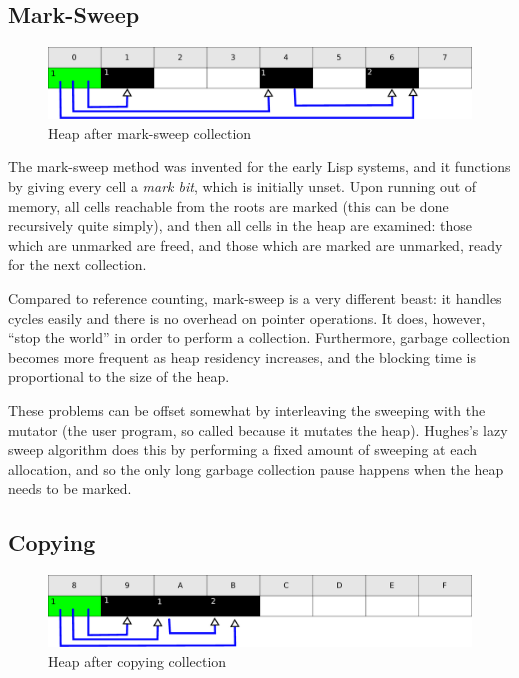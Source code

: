\subsection{Mark-Sweep}
\label{sec:lit-gc-marksweep}

\begin{figure}[h]
  \centering
  \includegraphics[width=\textwidth]{lit-gc-marksweep}
  \caption{Heap after mark-sweep collection}
  \label{fig:lit-gc-marksweep}
\end{figure}

The mark-sweep method was invented for the early Lisp
systems\cite{McCarthy60}, and it functions by giving every \gls{cell}
a \textit{mark bit}, which is initially unset. Upon running out of
memory, all cells reachable from the roots are marked (this can be
done recursively quite simply), and then all \glspl{cell} in the heap
are examined: those which are unmarked are freed, and those which are
marked are unmarked, ready for the next collection.

Compared to reference counting, mark-sweep is a very different beast:
it handles cycles easily and there is no overhead on pointer
operations. It does, however, ``\gls{stop the world}'' in order to
perform a collection\cite{GarbageCollection}. Furthermore, garbage
collection becomes more frequent as \gls{heap residency} increases,
and the blocking time is proportional to the size of the heap.

These problems can be offset somewhat by interleaving the sweeping
with the \gls{mutator} (the user program, so called because it mutates
the heap). Hughes's lazy sweep algorithm\cite{Hughes82} does this by
performing a fixed amount of sweeping at each allocation, and so the
only long garbage collection pause happens when the heap needs to be
marked.

\subsection{Copying}
\label{sec:lit-gc-copying}

\begin{figure}[h]
  \centering
  \includegraphics[width=\textwidth]{lit-gc-copying}
  \caption{Heap after copying collection}
  \label{fig:lit-gc-copying}
\end{figure}

